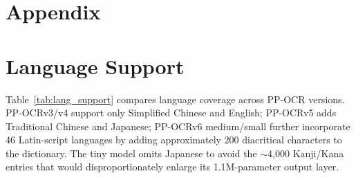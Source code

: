 \documentclass[11pt, a4paper,logo,  copyright, nonumbering]{paddleocr}
\begin{document}
\newpage
\appendix

\section*{Appendix}
\label{sec:appendix}

\section{Language Support}
\label{sec:language_support}

Table~\ref{tab:lang_support} compares language coverage across PP-OCR versions. PP-OCRv3/v4 support only Simplified Chinese and English; PP-OCRv5 adds Traditional Chinese and Japanese; PP-OCRv6 medium/small further incorporate 46 Latin-script languages by adding approximately 200 diacritical characters to the dictionary. The tiny model omits Japanese to avoid the $\sim$4,000 Kanji/Kana entries that would disproportionately enlarge its 1.1M-parameter output layer.
\end{document}
